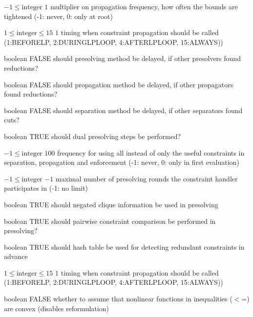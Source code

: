 %
{$-1\leq\textrm{integer}$}%
{$1$}%
{multiplier on propagation frequency, how often the bounds are tightened (-1: never, 0: only at root)}%
{}

%
{$1\leq\textrm{integer}\leq15$}%
{$1$}%
{timing when constraint propagation should be called (1:BEFORELP, 2:DURINGLPLOOP, 4:AFTERLPLOOP, 15:ALWAYS))}%
{}

%
{boolean}%
{FALSE}%
{should presolving method be delayed, if other presolvers found reductions?}%
{}

%
{boolean}%
{FALSE}%
{should propagation method be delayed, if other propagators found reductions?}%
{}

%
{boolean}%
{FALSE}%
{should separation method be delayed, if other separators found cuts?}%
{}

%
{boolean}%
{TRUE}%
{should dual presolving steps be performed?}%
{}

%
{$-1\leq\textrm{integer}$}%
{$100$}%
{frequency for using all instead of only the useful constraints in separation, propagation and enforcement (-1: never, 0: only in first evaluation)}%
{}

%
{$-1\leq\textrm{integer}$}%
{$-1$}%
{maximal number of presolving rounds the constraint handler participates in (-1: no limit)}%
{}

%
{boolean}%
{TRUE}%
{should negated clique information be used in presolving}%
{}

%
{boolean}%
{TRUE}%
{should pairwise constraint comparison be performed in presolving?}%
{}

%
{boolean}%
{TRUE}%
{should hash table be used for detecting redundant constraints in advance}%
{}

%
{$1\leq\textrm{integer}\leq15$}%
{$1$}%
{timing when constraint propagation should be called (1:BEFORELP, 2:DURINGLPLOOP, 4:AFTERLPLOOP, 15:ALWAYS))}%
{}

%
{boolean}%
{FALSE}%
{whether to assume that nonlinear functions in inequalities ($<$=) are convex (disables reformulation)}%
{}


